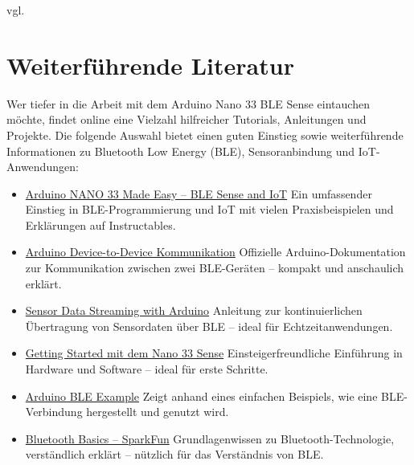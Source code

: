 vgl. \cite{Arduino2025a}






\section{Weiterführende Literatur}

Wer tiefer in die Arbeit mit dem Arduino Nano 33 BLE Sense eintauchen möchte, findet online eine Vielzahl hilfreicher Tutorials, Anleitungen und Projekte. Die folgende Auswahl bietet einen guten Einstieg sowie weiterführende Informationen zu Bluetooth Low Energy (BLE), Sensoranbindung und IoT-Anwendungen:

\begin{itemize}
	\item \href{https://www.instructables.com/Arduino-NANO-33-Made-Easy-BLE-Sense-and-IoT/}{Arduino NANO 33 Made Easy – BLE Sense and IoT}  
	\newline Ein umfassender Einstieg in BLE-Programmierung und IoT mit vielen Praxisbeispielen und Erklärungen auf Instructables.
	
	\item \href{https://docs.arduino.cc/tutorials/nano-33-ble-sense/ble-device-to-device}{Arduino Device-to-Device Kommunikation}  
	\newline Offizielle Arduino-Dokumentation zur Kommunikation zwischen zwei BLE-Geräten – kompakt und anschaulich erklärt.
	
	\item \href{https://projecthub.arduino.cc/8bitkick/sensor-data-streaming-with-arduino-a6b9f9}{Sensor Data Streaming with Arduino}  
	\newline Anleitung zur kontinuierlichen Übertragung von Sensordaten über BLE – ideal für Echtzeitanwendungen.
	
	\item \href{https://www.okdo.com/getting-started/get-started-with-arduino-nano-33-sense/}{Getting Started mit dem Nano 33 Sense}  
	\newline Einsteigerfreundliche Einführung in Hardware und Software – ideal für erste Schritte.
	
	\item \href{https://rootsaid.com/arduino-ble-example/}{Arduino BLE Example}  
	\newline Zeigt anhand eines einfachen Beispiels, wie eine BLE-Verbindung hergestellt und genutzt wird.
	
	\item \href{https://learn.sparkfun.com/tutorials/bluetooth-basics}{Bluetooth Basics – SparkFun}  
	\newline Grundlagenwissen zu Bluetooth-Technologie, verständlich erklärt – nützlich für das Verständnis von BLE.
	

\end{itemize}
